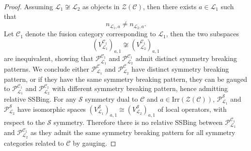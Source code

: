 \documentclass[10pt,a4paper]{amsart}
\newcommand{\Irr}{\text{Irr}}
\newcommand{\be}{\begin{equation}}
\newcommand{\cC}{\mathcal{C}}
\newcommand{\cL}{\mathcal{L}}
\newcommand{\cP}{\mathcal{P}}
\newcommand{\cS}{\mathcal{S}}
\newcommand{\cZ}{\mathcal{Z}}
\newcommand{\ee}{\end{equation}}
\begin{document}
\begin{proof}
    Assuming $\cL_1\not\cong \cL_2$ as objects in $\cZ(\cC)$, then there exists $a\in \cL_1$ such that 
    \be
    n_{\cL_1,a}\neq n_{\cL_2,a}.
    \ee
    Let $\cC_1$ denote the fusion category corresponding to $\cL_1$, then the two subspaces 
    \be
        (V_{\cL_1}^{\cC_1})_{a,1} \not\cong (V_{\cL_2}^{\cC_1})_{a,1}
    \ee
    are inequivalent, showing that $\cP^{\cC_1}_{\cL_1}$ and $\cP^{\cC_1}_{\cL_2}$ admit distinct symmetry breaking patterns. We conclude either $\cP^{\cC}_{\cL_1}$ and $\cP^{\cC}_{\cL_2}$ have distinct symmetry breaking pattern, or if they have the same symmetry breaking pattern, they can be gauged to $\cP^{\cC_1}_{\cL_1}$ and $\cP^{\cC_1}_{\cL_2}$ with different symmetry breaking pattern, hence admitting relative SSBing. 
    For any $\cS$ symmetry dual to $\cC$ and $a\in \Irr(\cZ(\cC))$, $\cP^{\cS}_{\cL_1}$ and $\cP^{\cS}_{\cL_2}$ have isomorphic spaces $(V_{\cL_1}^{{\cS}})_{a,1}\cong (V_{\cL_2}^{{\cS}})_{a,1}$ of local operators, with respect to the $\cS$ symmetry. Therefore there is no relative SSBing between $\cP^{\cC_1}_{\cL_1}$ and $\cP^{\cC_1}_{\cL_2}$ as they admit the same symmetry breaking pattern for all symmetry categories related to $\cC$ by gauging. 
\end{proof}
\end{document}
